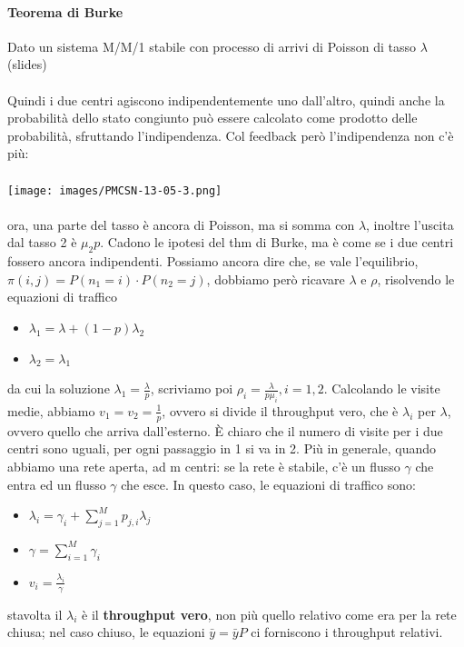 \documentclass{article}
\begin{document}
\paragraph{Teorema di Burke} Dato un sistema M/M/1 stabile con processo di arrivi di Poisson di tasso $\lambda$ (slides)\\\\ Quindi i due centri agiscono indipendentemente uno dall'altro, quindi anche la probabilità dello stato congiunto può essere calcolato come prodotto delle probabilità, sfruttando l'indipendenza. Col feedback però l'indipendenza non c'è più: \\\\
\texttt{[image: images/PMCSN-13-05-3.png]} \\\\
ora, una parte del tasso è ancora di Poisson, ma si somma con $\lambda$, inoltre l'uscita dal tasso 2 è $\mu_2 p$. Cadono le ipotesi del thm di Burke, ma è come se i due centri fossero ancora indipendenti. Possiamo ancora dire che, se vale l'equilibrio, $\pi(i,j) = P(n_1 = i)\cdot P(n_2 = j)$, dobbiamo però ricavare $\lambda$ e $\rho$, risolvendo le equazioni di traffico
\begin{itemize}
\item $\lambda_1 = \lambda + (1-p)\lambda_2$
\item $\lambda_2 = \lambda_1$
\end{itemize}
da cui la soluzione $\lambda_1 = \frac{\lambda}{p}$, scriviamo poi $\rho_i = \frac{\lambda}{p\mu_i}, i=1,2$. Calcolando le visite medie, abbiamo $v_1 = v_2 = \frac{1}{p}$, ovvero si divide il throughput vero, che è $\lambda_i$ per $\lambda$, ovvero quello che arriva dall'esterno. È chiaro che il numero di visite per i due centri sono uguali, per ogni passaggio in 1 si va in 2. Più in generale, quando abbiamo una rete aperta, ad m centri: se la rete è stabile, c'è un flusso $\gamma$ che entra ed un flusso $\gamma$ che esce. In questo caso, le equazioni di traffico sono:
\begin{itemize}
\item $\lambda_i = \gamma_i + \sum\limits_{j=1}^{M} p_{j,i} \lambda_j$
\item $\gamma = \sum\limits_{i=1}^{M} \gamma_i$
\item $v_i = \frac{\lambda_i}{\gamma}$
\end{itemize}
stavolta il $\lambda_i$ è il \textbf{throughput vero}, non più quello relativo come era per la rete chiusa; nel caso chiuso, le equazioni $\bar{y} = \bar{y}P$ ci forniscono i throughput relativi.
\end{document}
